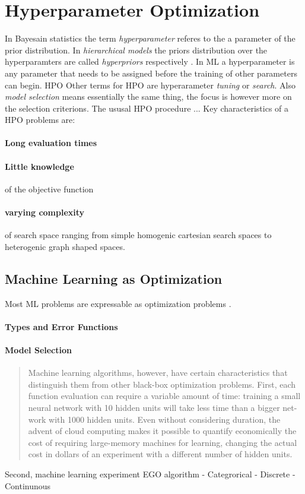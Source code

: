 \documentclass[english]{article}
\begin{document}
\section{Hyperparameter Optimization}
In Bayesain statistics the term \textit{hyperparameter} referes to the a parameter of the prior distribution. In \textit{hierarchical models} the priors distribution over the hyperparamters are called \textit{hyperpriors} respectively \cite[p.408]{bishop_neural_1995}. In \acf{ML} a hyperparameter is any parameter that needs to be assigned before the training of other parameters can begin.
\acf{HPO} Other terms for \ac{HPO} are hyperarameter \textit{tuning} or \textit{search}. Also \textit{model selection} means essentially the same thing, the focus is however more on the selection criterions.
The ususal \ac{HPO} procedure ...
Key characteristics of a \ac{HPO} problems are:
\paragraph{Long evaluation times}
\paragraph{Little knowledge} of the objective function
\paragraph{varying complexity} of search space ranging from simple homogenic cartesian search spaces to heterogenic graph shaped spaces.

\subsection{Machine Learning as Optimization}
Most \acf{ML} problems are expressable as optimization problems \cite{bennett_interplay_2006}.

\paragraph{Types and Error Functions}
\paragraph{Model Selection}



\begin{quote}
Machine learning algorithms, however, have certain characteristics that distinguish them from other black-box optimization problems.  First, each function evaluation can require a variable amount of time:  training a small neural network with 10 hidden units will take less time than a bigger net-work with 1000 hidden units.  Even without considering duration, the advent of cloud computing makes it possible to quantify economically the cost of requiring large-memory machines for learning, changing the actual cost in dollars of an experiment with a different number of hidden units.
\end{quote}
Second, machine learning experiment EGO algorithm
 - Categrorical
 - Discrete
 - Continunous
\end{document}
